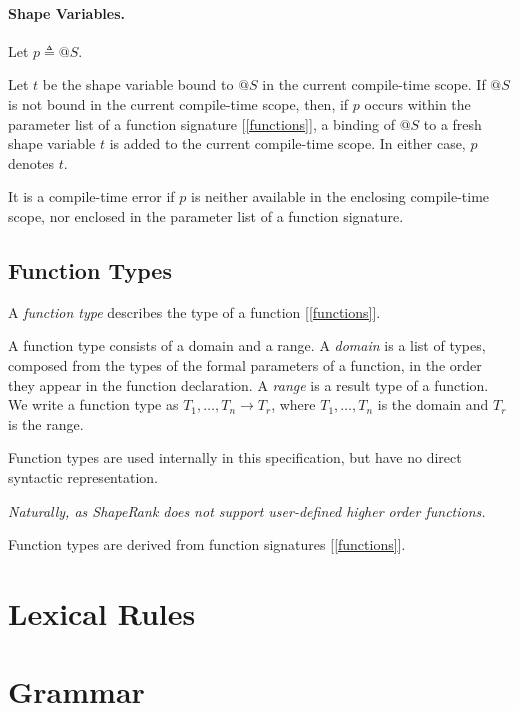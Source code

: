 \documentclass{article}
\begin{document}
 \paragraph{Shape Variables.}


 Let $p \triangleq @{}S$.
 
 Let $t$ be the shape variable bound to  $@{}S$ in the current compile-time scope. If $@{}S$ is not bound in the current compile-time scope, then, if $p$ occurs within the parameter list of a function signature [\ref{functions}],  a binding of  $@{}S$ to a fresh shape variable $t$ is added to the current compile-time scope. In either case, $p$ denotes  $t$. 
 
 It is a compile-time error if $p$ is neither available in the enclosing compile-time scope, nor enclosed in the parameter list of a function signature.
 

 
\subsection{Function Types}
\label{functionTypes}

A {\em function type} describes the type of a function [\ref{functions}].

A function type consists of a domain and a range. A {\em domain} is a list of types, composed from the types of the formal parameters of a function, in the order they appear in the function declaration. A {\em range} is a result type of a function. 
We write a  function type as $T_1, \ldots, T_n \to T_r$, where $T_1, \ldots, T_n$ is the domain and $T_r$ is the range.

Function types are used internally in this specification, but have no direct syntactic representation.

{\em 
Naturally, as ShapeRank does not support user-defined higher order functions.

Function types  are derived from function signatures [\ref{functions}].
}



\section{Lexical Rules}
\label{lexicalRules}
\printlexitable

\section{Grammar}
\label{grammar}
\printgrammartable
\end{document}

